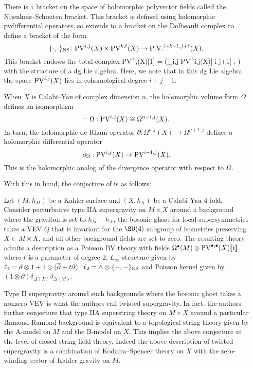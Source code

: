 \documentclass[11pt]{amsart}
\def\pv{{\rm PV}}
\begin{document}
There is a bracket on the space of holomorphic polyvector fields called the Nijenhuis--Schouten bracket.
This bracket is defined using holomorphic pvdifferential operators, so extends to a bracket on the Dolbeault complex to define a bracket of the form
\[
  \{\cdot, \cdot\}_{\rm NS} \colon \pv^{i,j}(X) \times \pv^{k,\ell}(X) \to \PV^{i+k-1, j+\ell}(X) .
\]
This bracket endows the total complex
\beqn\label{eqn:pvlie1}
\pv^{\bu,\bu}(X)[1] = \left(\oplus_{i,j} \pv^{i,j}(X)[-i-j+1] , \dbar \right)
\eeqn
with the structure of a dg Lie algebra.
Here, we note that in this dg Lie algebra the space $\pv^{i,j}(X)$ lies in cohomological degree $i+j-1$.

When $X$ is Calabi--Yau of complex dimension $n$, the holomorphic volume form $\Omega$ defines an isomorphism
\[
  \vdash \Omega : \pv^{i,j}(X) \cong \Omega^{n-i, j}(X).
\]
In turn, the holomorphic de Rham operator $\partial : \Omega^{p, j}(X) \to \Omega^{p+1,j}$ defines a holomorphic differential operator
\[
  \partial_{\Omega} : \pv^{i,j}(X) \to \pv^{i-1,j}(X) .
\]
This is the holomorphic analog of the divergence operator with respect to $\Omega$.

With this in hand, the conjecture of \cite{} is as follows:

\begin{conj}
  Let $(M,h_{M})$ be a Kahler surface and $(X, h_{X})$ be a Calabi-Yau 4-fold. Consider perturbative type IIA supergravity on $M\times X$ around a background where the graviton is set to $h_{M}+ h_{X}$, the bosonic ghost for local supersymmetries takes a VEV $Q$ that is invariant for the $\SU(4)$ subgroup of isometries preserving $X\subset M\times X$, and all other background fields are set to zero. The resulting theory admits a description as a Poisson BV theory with fields $\Omega^{\bullet}(M)\otimes \pv^{\bullet, \bullet}(X)[\![t]\!]$ where $t$ is a parameter of degree 2, $L_{\infty}$-structure given by $\ell_{1} = d\otimes 1+ 1\otimes (\overline{\partial}+t\partial)$, $\ell_{2} = \wedge\otimes \{-,-\}_{\rm NS}$ and Poisson kernel given by $(1\otimes \partial)\delta_{\Delta(X)}\delta_{\Delta (M)}$.
\end{conj}

Type II supergravity around such backgrounds where the bosonic ghost takes a nonzero VEV is what the authors call twisted supergravity. In fact, the authors further conjecture that type IIA superstring theory on $M\times X$ around a particular Ramond-Ramond background is equivalent to a topological string theory given by the A-model on $M$ and the B-model on $X$. This implies the above conjecture at the level of closed string field theory. Indeed the above description of twisted supergravity is a combination of Kodaira--Spencer theory on $X$ with the zero-winding sector of Kahler gravity on $M$.
\end{document}

